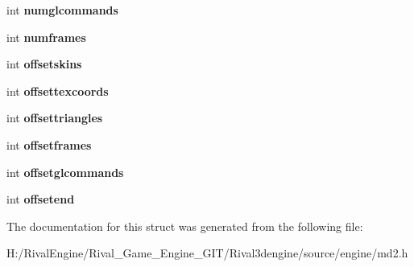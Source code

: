 \begin{DoxyCompactItemize}
\mbox{\label{structmd2_1_1md2__header_a6dcb38df0a2aa0fd3d5629b98810f823}} 
int {\bfseries numglcommands}
\item 
\mbox{\label{structmd2_1_1md2__header_a1042cc10dadd94b6489adadfec8ae94c}} 
int {\bfseries numframes}
\item 
\mbox{\label{structmd2_1_1md2__header_a48709bb5e3da07324f4b93eed0c36855}} 
int {\bfseries offsetskins}
\item 
\mbox{\label{structmd2_1_1md2__header_abb46f318f0de01c57fb862ffe14333b0}} 
int {\bfseries offsettexcoords}
\item 
\mbox{\label{structmd2_1_1md2__header_ada9fdad766163f7bc3421ec23ff003a2}} 
int {\bfseries offsettriangles}
\item 
\mbox{\label{structmd2_1_1md2__header_aa272aa47f7415d3e97fccba7651628ce}} 
int {\bfseries offsetframes}
\item 
\mbox{\label{structmd2_1_1md2__header_abe9be0df1fd93bbeefd95296415383da}} 
int {\bfseries offsetglcommands}
\item 
\mbox{\label{structmd2_1_1md2__header_a47175d928942ceb56956a2363a947308}} 
int {\bfseries offsetend}
\end{DoxyCompactItemize}


The documentation for this struct was generated from the following file\+:\begin{DoxyCompactItemize}
\item 
H\+:/\+Rival\+Engine/\+Rival\+\_\+\+Game\+\_\+\+Engine\+\_\+\+G\+I\+T/\+Rival3dengine/source/engine/md2.\+h\end{DoxyCompactItemize}
